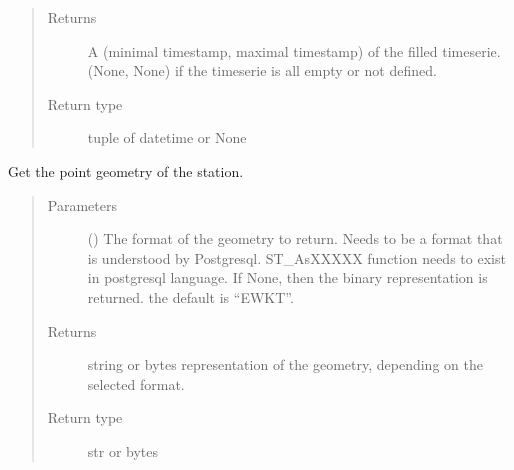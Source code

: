 \documentclass[letterpaper,10pt,english]{sphinxmanual}
\begin{document}
\begin{fulllineitems}
\begin{fulllineitems}
\begin{quote}
\begin{description}
\begin{itemize}
\end{itemize}

\item[{Returns}] \leavevmode
\sphinxAtStartPar
A (minimal timestamp, maximal timestamp) of the filled timeserie.
(None, None) if the timeserie is all empty or not defined.

\item[{Return type}] \leavevmode
\sphinxAtStartPar
tuple of datetime or None

\end{description}\end{quote}

\end{fulllineitems}


\begin{fulllineitems}
\label{\detokenize{weatherDB:weatherDB.station.StationBase.get_geom}}
\sphinxAtStartPar
Get the point geometry of the station.
\begin{quote}\begin{description}
\item[{Parameters}] \leavevmode
\sphinxAtStartPar
{} (\sphinxstyleliteralemphasis{\sphinxupquote{, }}) \textendash{} The format of the geometry to return.
Needs to be a format that is understood by Postgresql.
ST\_AsXXXXX function needs to exist in postgresql language.
If None, then the binary representation is returned.
the default is “EWKT”.

\item[{Returns}] \leavevmode
\sphinxAtStartPar
string or bytes representation of the geometry,
depending on the selected format.

\item[{Return type}] \leavevmode
\sphinxAtStartPar
str or bytes

\end{description}\end{quote}

\end{fulllineitems}


\end{fulllineitems}
\end{document}
